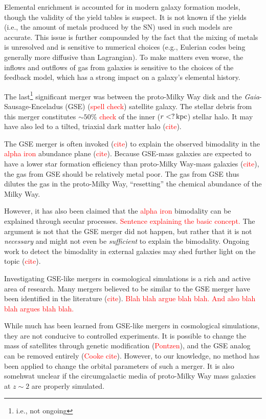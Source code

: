 Elemental enrichment is accounted for in modern galaxy formation models, though the validity of the yield tables is suspect. It is not known if the yields (i.e., the amount of metals produced by the SN) used in such models are accurate. This issue is further compounded by the fact that the mixing of metals is unresolved and is sensitive to numerical choices (e.g., Eulerian codes being generally more diffusive than Lagrangian). To make matters even worse, the inflows and outflows of gas from galaxies is sensitive to the choices of the feedback model, which has a strong impact on a galaxy's elemental history.




The last\footnote{i.e., not ongoing} significant merger was between the
proto-Milky Way disk and the {\em Gaia}-Sausage-Enceladus (GSE)
(\textcolor{red}{spell check}) satellite galaxy. The stellar debris from this
merger constitutes $\sim50\%$ \textcolor{red}{check} of the inner ($r<?\,\textrm{kpc}$)
stellar halo. It may have also led to a tilted, triaxial dark matter halo
(\textcolor{red}{cite}).

The GSE merger is often invoked (\textcolor{red}{cite}) to explain the observed
bimodality in the \textcolor{red}{alpha iron} abundance plane
(\textcolor{red}{cite}). Because GSE-mass galaxies are expected to have a lower
star formation efficiency than proto-Milky Way-mass galaxies
(\textcolor{red}{cite}), the gas from GSE should be relatively metal poor. The
gas from GSE thus dilutes the gas in the proto-Milky Way, ``resetting'' the
chemical abundance of the Milky Way.

However, it has also been claimed that the \textcolor{red}{alpha iron}
bimodality can be explained through secular processes. \textcolor{red}{Sentence
explaining the basic concept.} The argument is not that the GSE merger did not
happen, but rather that it is not {\it necessary} and might not even be {\it
sufficient} to explain the bimodality. Ongoing work to detect the bimodality in
external galaxies may shed further light on the topic (\textcolor{red}{cite}).

Investigating GSE-like mergers in cosmological simulations is a rich and active
area of research. Many mergers believed to be similar to the GSE merger have
been identified in the literature (\textcolor{red}{cite}). \textcolor{red}{Blah
blah argue blah blah. And also blah blah argues blah blah.}

While much has been learned from GSE-like mergers in cosmological simulations,
they are not conducive to controlled experiments. It is possible to change the
mass of satellites through genetic modification (\textcolor{red}{Pontzen}), and
the GSE analog can be removed entirely (\textcolor{red}{Cooke cite}). However,
to our knowledge, no method has been applied to change the orbital parameters of
such a merger. It is also somehwat unclear if the circumgalactic media of
proto-Milky Way mass galaxies at $z\sim2$ are properly simulated.

